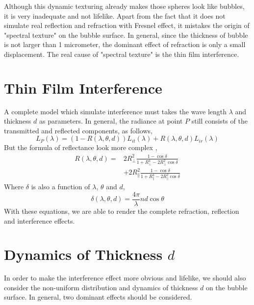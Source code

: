 \documentclass[9pt, conference]{IEEEtran}
\begin{document}
Although this dynamic texturing already makes those spheres look like bubbles, it is very inadequate and not lifelike. Apart from the fact that it does not simulate real reflection and refraction with Fresnel effect, it mistakes the origin of "spectral texture" on the bubble surface. In general, since the thickness of bubble is not larger than 1 micrometer, the dominant effect of refraction is only a small displacement. The real cause of "spectral texture" is the thin film interference.

\section{\label{sec2}Thin Film Interference}
A complete model which simulate interference must takes the wave length $\lambda$ and thickness $d$ as parameters. In general, the radiance at point $P$ still consists of the transmitted and reflected components, as follows,
\begin{equation}
	L_P(\lambda) = (1-R(\lambda, \theta, d))L_{it}(\lambda) + R(\lambda, \theta, d)L_{ir}(\lambda)
\end{equation}
But the formula of reflectance look more complex \cite{interferencepaper},
\begin{equation}
\begin{split}
	R(\lambda, \theta, d) =& 2R_\bot^2\frac{1-\cos\delta}{1+R_\bot^4-2R_\bot^2\cos\delta}\\ &+2R_\parallel^2\frac{1-\cos\delta}{1+R_\parallel^4-2R_\parallel^2\cos\delta}
\end{split}
\end{equation}
Where $\delta$ is also a function of $\lambda$, $\theta$ and $d$,
\begin{equation}
	\delta(\lambda, \theta, d) = \frac{4\pi}{\lambda}nd\cos\theta
\end{equation}
With these equations, we are able to render the complete refraction, reflection and interference effects.

\section{\label{sec3}Dynamics of Thickness $d$}
In order to make the interference effect more obvious and lifelike, we should also consider the non-uniform distribution and dynamics of thickness $d$ on the bubble surface. In general, two dominant effects should be considered.
\end{document}
